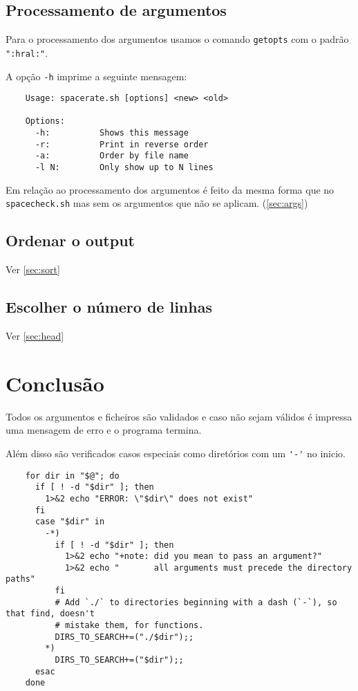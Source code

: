 \subsection{Processamento de argumentos}

Para o processamento dos argumentos usamos o comando \texttt{getopts} com o padrão \texttt{":hral:"}.

A opção \Verb|-h| imprime a seguinte mensagem:

\begin{listing}[H]
  \begin{verbatim}
    Usage: spacerate.sh [options] <new> <old>

    Options:
      -h:          Shows this message
      -r:          Print in reverse order
      -a:          Order by file name
      -l N:        Only show up to N lines
  \end{verbatim}
\end{listing}

Em relação ao processamento dos argumentos é feito da mesma forma que no \texttt{spacecheck.sh} mas sem os argumentos que não se aplicam. (\ref{sec:args})

\subsection{Ordenar o output}

Ver \ref{sec:sort}

\subsection{Escolher o número de linhas}

Ver \ref{sec:head}


\section{Conclusão}

Todos os argumentos e ficheiros são validados e caso não sejam válidos é impressa uma mensagem de erro e o programa termina.

Além disso são verificados casos especiais como diretórios com um \Verb|'-'| no inicio.

\begin{listing}[H]
  \begin{verbatim}
    for dir in "$@"; do
      if [ ! -d "$dir" ]; then
        1>&2 echo "ERROR: \"$dir\" does not exist"
      fi
      case "$dir" in
        -*)
          if [ ! -d "$dir" ]; then
            1>&2 echo "+note: did you mean to pass an argument?"
            1>&2 echo "       all arguments must precede the directory paths"
          fi
          # Add `./` to directories beginning with a dash (`-`), so that find, doesn't
          # mistake them, for functions.
          DIRS_TO_SEARCH+=("./$dir");;
        *)
          DIRS_TO_SEARCH+=("$dir");;
      esac
    done
  \end{verbatim}
\end{listing}
